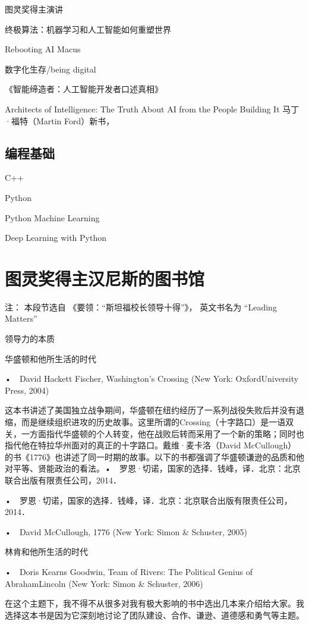 图灵奖得主演讲

终极算法：机器学习和人工智能如何重塑世界

Rebooting AI     Macus

数字化生存/being digital

《智能缔造者：人工智能开发者口述真相》

Architects of Intelligence: The Truth About AI from the People Building It  马丁·福特（Martin Ford）新书，


\subsection{编程基础}

C++

Python

Python Machine Learning

Deep Learning with Python


\section{图灵奖得主汉尼斯的图书馆 }
注： 本段节选自 《要领：“斯坦福校长领导十得”》， 英文书名为
“Leading Matters”

领导力的本质

华盛顿和他所生活的时代

•　David Hackett Fischer, Washington’s Crossing (New York: OxfordUniversity Press, 2004)

这本书讲述了美国独立战争期间，华盛顿在纽约经历了一系列战役失败后并没有退缩，而是继续组织进攻的历史故事。这里所谓的Crossing（十字路口）是一语双关，一方面指代华盛顿的个人转变，他在战败后转而采用了一个新的策略；同时也指代他在特拉华州面对的真正的十字路口。戴维·麦卡洛（David McCullough）的书《1776》也讲述了同一时期的故事。以下的书都强调了华盛顿谦逊的品质和他对平等、贤能政治的看法。•　罗恩·切诺，国家的选择．钱峰，译．北京：北京联合出版有限责任公司，2014．


•　罗恩·切诺，国家的选择．钱峰，译．北京：北京联合出版有限责任公司，2014．

•　David McCullough, 1776 (New York: Simon \& Schuster, 2005)

林肯和他所生活的时代

•　Doris Kearns Goodwin, Team of Rivers: The Political Genius of AbrahamLincoln (New York: Simon \& Schuster, 2006)

在这个主题下，我不得不从很多对我有极大影响的书中选出几本来介绍给大家。我选择这本书是因为它深刻地讨论了团队建设、合作、谦逊、道德感和勇气等主题。

